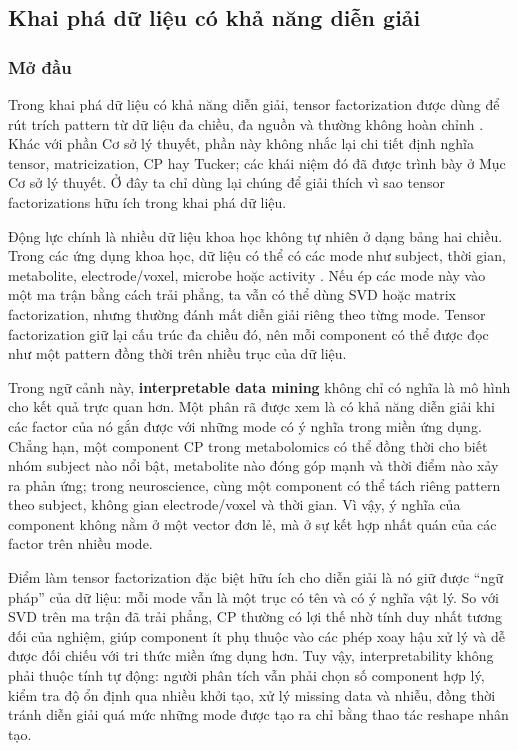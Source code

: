 \subsection{Khai phá dữ liệu có khả năng diễn giải}

\subsubsection{Mở đầu}
\label{sec:dm-context}

Trong khai phá dữ liệu có khả năng diễn giải, tensor factorization được dùng để
rút trích pattern từ dữ liệu đa chiều, đa nguồn và thường không hoàn chỉnh
\cite{chrysos2025foundationsTutorial}. Khác với phần Cơ sở lý thuyết, phần này
không nhắc lại chi tiết định nghĩa tensor, matricization, CP hay Tucker; các khái
niệm đó đã được trình bày ở Mục Cơ sở lý thuyết. Ở đây ta chỉ dùng lại chúng để
giải thích vì sao tensor factorizations hữu ích trong khai phá dữ liệu.

Động lực chính là nhiều dữ liệu khoa học không tự nhiên ở dạng bảng hai chiều. Trong
các ứng dụng khoa học, dữ liệu có thể có các mode như subject, thời gian, metabolite,
electrode/voxel, microbe hoặc activity \cite{chrysos2025foundationsTutorial}. Nếu ép
các mode này vào một ma trận bằng cách trải phẳng, ta vẫn có thể dùng SVD hoặc matrix
factorization, nhưng thường đánh mất diễn giải riêng theo từng mode. Tensor
factorization giữ lại cấu trúc đa chiều đó, nên mỗi component có thể được đọc như một
pattern đồng thời trên nhiều trục của dữ liệu.

Trong ngữ cảnh này, \textbf{interpretable data mining} không chỉ có nghĩa là
mô hình cho kết quả trực quan hơn. Một phân rã được xem là có khả năng diễn giải
khi các factor của nó gắn được với những mode có ý nghĩa trong miền ứng dụng.
Chẳng hạn, một component CP trong metabolomics có thể đồng thời cho biết nhóm
subject nào nổi bật, metabolite nào đóng góp mạnh và thời điểm nào xảy ra phản
ứng; trong neuroscience, cùng một component có thể tách riêng pattern theo
subject, không gian electrode/voxel và thời gian. Vì vậy, ý nghĩa của component
không nằm ở một vector đơn lẻ, mà ở sự kết hợp nhất quán của các factor trên
nhiều mode.

Điểm làm tensor factorization đặc biệt hữu ích cho diễn giải là nó giữ được
``ngữ pháp'' của dữ liệu: mỗi mode vẫn là một trục có tên và có ý nghĩa vật lý.
So với SVD trên ma trận đã trải phẳng, CP thường có lợi thế nhờ tính duy nhất
tương đối của nghiệm, giúp component ít phụ thuộc vào các phép xoay hậu xử lý và
dễ được đối chiếu với tri thức miền ứng dụng hơn. Tuy vậy, interpretability không
phải thuộc tính tự động: người phân tích vẫn phải chọn số component hợp lý, kiểm
tra độ ổn định qua nhiều khởi tạo, xử lý missing data và nhiễu, đồng thời tránh
diễn giải quá mức những mode được tạo ra chỉ bằng thao tác reshape nhân tạo.

